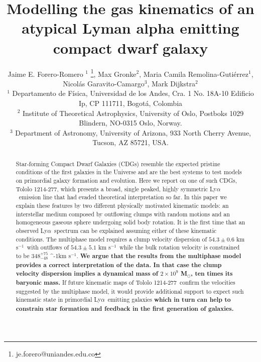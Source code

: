 \documentclass[a4paper,fleqn,usenatbib]{mnras}
\newcommand{\tol}{Tololo 1214-277}
\newcommand{\lya}{\ifmmode{{\rm Ly}\alpha}\else Ly$\alpha$\ \fi}
\newcommand{\kms}{\ifmmode\mathrm{km\ s}^{-1}\else km s$^{-1}$\fi}
\newcommand{\sigmaclump}{$54.3\pm 0.6$ km s$^{-1}$}
\newcommand{\inftyclump}{$54.3\pm 5.1$ km s$^{-1}$}
\begin{document}
\title[An atypical \lya dwarf galaxy]{
Modelling the gas kinematics of an atypical Lyman alpha emitting compact dwarf galaxy}
\author[J.E. Forero-Romero et al.]
{Jaime E. Forero-Romero $^{1}$ \thanks{je.forero@uniandes.edu.co},
Max Gronke$^2$, 
Maria Camila Remolina-Guti\'errez$^1$,
\newauthor
Nicol\'as Garavito-Camargo$^3$, 
Mark Dijkstra$^2$\\
$^1$ Departamento de F\'isica, Universidad de los Andes, Cra. 1
  No. 18A-10 Edificio Ip, CP 111711, Bogot\'a, Colombia \\
$^2$ Institute of Theoretical Astrophysics, University of Oslo,
Postboks 1029 Blindern, NO-0315 Oslo, Norway.\\
$^3$ Department of Astronomy, University of Arizona, 933 North Cherry
Avenue, Tucson, AZ 85721, USA. 
}


\maketitle


\begin{abstract}
	
Star-forming Compact Dwarf Galaxies (CDGs) 
resemble the expected pristine conditions of the first galaxies in the
Universe and are the best systems to test models on primordial galaxy
formation and evolution. 
Here we report on one of such CDGs, \tol, which presents
a broad, single peaked, highly symmetric \lya emission line that had
evaded theoretical interpretation so far.  
In this paper we explain these features by two different physically
motivated kinematic models: 
an interstellar medium composed by outflowing clumps with 
random motions and an homogeneous gaseous sphere undergoing solid body
rotation.
It is the first time that an observed \lya spectrum can be explained
assuming either of these kinematic conditions.
The multiphase model requires a clump velocity dispersion of
\sigmaclump\ with outflows of \inftyclump\, while the
bulk rotation velocity is constrained to be $348^{+75}_{-48}$ \kms.
{\bf We argue that the results from the multiphase model 
provides a correct interpretation of the data.
In that case the clump velocity dispersion implies a dynamical mass of
$2\times 10^{9}$ M$_{\odot}$,  ten times its baryonic mass.}
If future kinematic maps of \tol\ confirm the velocities suggested by
the multiphase model, it would provide additional support to expect
such kinematic state in primordial \lya emitting galaxies {\bf which in
turn can help to constrain star formation and feedback in the first
generation of galaxies.}
\end{abstract}
\end{document}
